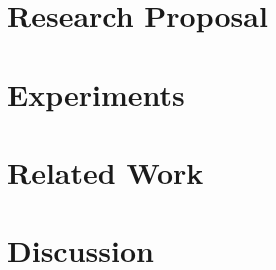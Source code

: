 \documentclass{sig-alternate}
\begin{document}
\section{Research Proposal}


\section{Experiments}


\section{Related Work}


\vspace{-0.2cm}
\section{Discussion}
\vspace{-0.1cm}


%
\vspace{-0.2cm}

%
%
\newpage

\appendix
\end{document}
